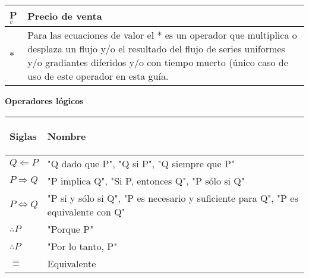 \begin{spacing}{1}
\begin{center}
\begin{tabular}{ |p{2.5cm}|p{9.5cm}|}
			P$_{v}$                   & Precio de venta                                                                                                                                                                                                                     \\ \hline
			$*$                       & Para las ecuaciones de valor el * es un operador que multiplica o desplaza un flujo y/o el resultado del flujo de series uniformes y/o gradiantes diferidos y/o con tiempo muerto (único caso de uso de este operador en esta guía. \\ \hline
		\end{tabular}
	\end{center}
\end{spacing}



\begin{center} \textbf {Operadores lógicos} \end{center}

\begin{spacing}{1}
	\begin{center}
		\begin{tabular}{ |p{2.5cm}|p{9.5cm}|}
			\hline
			\rowcolor{orange!50}
			\begin{center}\textbf{Siglas} \end{center} & \begin{center} \textbf{Nombre} \end{center}                                 \\ \hline
			
			$ Q \Leftarrow P $        & "Q dado que P", "Q si P", "Q siempre que P"               \\ \hline
			
			$ P \Rightarrow Q $       & "P implica Q", "Si P, entonces Q", "P sólo si Q"          \\ \hline
			
			$ P \Leftrightarrow Q $   & "P si y sólo si Q", "P es necesario y suficiente para Q", 
			"P es equivalente con Q"                                                              \\ \hline
			
			$ \therefore P　$         & "Porque P"                                                \\ \hline
			
			$ \therefore  P $         & "Por lo tanto, P"                                         \\ \hline
			
			$\equiv$                  & Equivalente                                               \\ \hline
		\end{tabular}
	\end{center}
\end{spacing}
\newpage

